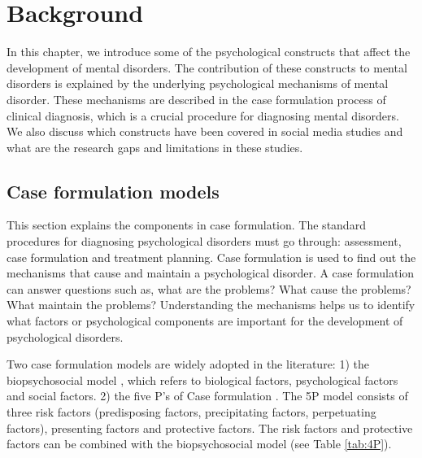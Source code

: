 
\chapter{Background}

In this chapter, we introduce some of the psychological constructs that affect the development of mental disorders. The contribution of these constructs to mental disorders is explained by the underlying psychological mechanisms of mental disorder. These mechanisms are described in the case formulation process of clinical diagnosis, which is a crucial procedure for diagnosing mental disorders.  We also discuss which constructs have been covered in social media studies and what are the research gaps and limitations in these studies.

\section{Case formulation models}
This section explains the components in case formulation. The standard procedures for diagnosing psychological disorders must go through: assessment, case formulation and treatment planning. Case formulation is used to find out the mechanisms that cause and maintain a psychological disorder. A case formulation can answer questions such as, what are the problems? What cause the problems? What maintain the problems? Understanding the mechanisms helps us to identify what factors or psychological components are important for the development of psychological disorders. 

Two case formulation models are widely adopted in the literature: 1) the biopsychosocial model \cite{george1980clinical}, which refers to biological factors, psychological factors and social factors.  2) the five P's of Case formulation \cite{macneil2012diagnosis}. The 5P model consists of three risk factors (predisposing factors, precipitating factors, perpetuating factors), presenting factors and protective factors. The risk factors and protective factors can be combined with the biopsychosocial model (see Table \ref{tab:4P}). 

